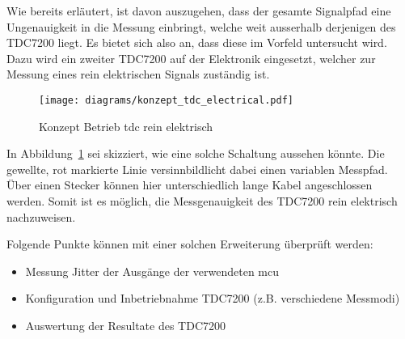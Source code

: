Wie bereits erläutert, ist davon auszugehen, dass der gesamte Signalpfad eine Ungenauigkeit in die Messung einbringt,
welche weit ausserhalb derjenigen des TDC7200 liegt. Es bietet sich also an, dass diese im Vorfeld untersucht wird.
Dazu wird ein zweiter TDC7200 auf der Elektronik eingesetzt, welcher zur Messung eines rein elektrischen Signals
zuständig ist.

\begin{figure}[H]
    \centering
    \texttt{[image: diagrams/konzept\_tdc\_electrical.pdf]}
    \caption{Konzept Betrieb \acrshort{tdc} rein elektrisch}\label{fig:konzept_tdc_electrical}
\end{figure}

In Abbildung~\ref{fig:konzept_tdc_electrical} sei skizziert, wie eine solche Schaltung aussehen könnte. Die gewellte,
rot markierte Linie versinnbildlicht dabei einen variablen Messpfad. Über einen Stecker können hier unterschiedlich lange
Kabel angeschlossen werden. Somit ist es möglich, die Messgenauigkeit des TDC7200 rein elektrisch nachzuweisen.

Folgende Punkte können mit einer solchen Erweiterung überprüft werden:

\begin{itemize}
    \item Messung Jitter der Ausgänge der verwendeten \acrshort{mcu}
    \item Konfiguration und Inbetriebnahme TDC7200 (z.B. verschiedene Messmodi)
    \item Auswertung der Resultate des TDC7200
\end{itemize}
